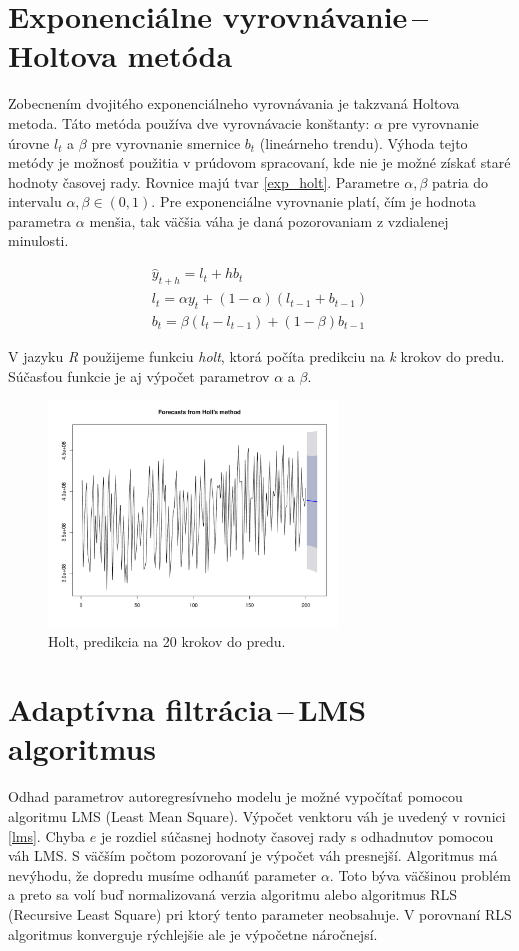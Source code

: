 \documentclass[12pt,a4paper,oneside,final]{article}
\theoremstyle{definition}
\theoremstyle{remark}
\numberwithin{equation}{section}
\begin{document}
\section{Exponenciálne vyrovnávanie\,--\,Holtova metóda}
Zobecnením dvojitého exponenciálneho vyrovnávania je takzvaná Holtova metoda.
Táto metóda používa dve vyrovnávacie konštanty: $\alpha$ pre vyrovnanie úrovne $l_t$
a $\beta$ pre vyrovnanie smernice $b_t$ (lineárneho trendu).
Výhoda tejto metódy je možnosť použitia v prúdovom spracovaní, kde nie je možné získať staré hodnoty časovej rady. 
Rovnice majú tvar \ref{exp_holt}. Parametre $\alpha, \beta$ patria do intervalu 
$\alpha,\beta \in (0,1)$. Pre exponenciálne vyrovnanie platí, 
čím je hodnota parametra $\alpha$ menšia, tak väčšia váha je daná pozorovaniam z
vzdialenej minulosti.

\begin{eqnarray} \label{exp_holt}
    \hat{y}_{t+h} = l_{t} + hb_{t} \\
    \nonumber l_t = \alpha y_t + (1 - \alpha) (l_{t-1} + b_{t-1}) \\
    \nonumber b_t = \beta (l_t - l_{t-1}) + (1 - \beta)b_{t-1} 
\end{eqnarray}
 
V jazyku \emph{R} použijeme funkciu \emph{holt}, ktorá počíta predikciu na \emph{k} krokov 
do predu. Súčasťou funkcie je aj výpočet parametrov $\alpha$ a $\beta$.

\begin{figure}[H]
    \begin{center}
        \includegraphics[width=.8\textwidth,height=6cm]{images/heap_holt.pdf}
        \caption{Holt, predikcia na 20 krokov do predu.}
        \label{obr:heap_holt}
    \end{center}
\end{figure}

\section{Adaptívna filtrácia\,--\,LMS algoritmus}
Odhad parametrov autoregresívneho modelu je možné vypočítať 
pomocou algoritmu LMS (Least Mean Square). Výpočet venktoru váh je uvedený v
rovnici \ref{lms}. Chyba $e$ je rozdiel súčasnej hodnoty časovej rady s odhadnutov pomocou
váh LMS. S väčším počtom pozorovaní je výpočet váh presnejší. Algoritmus 
má nevýhodu, že dopredu musíme odhanúť parameter $\alpha$. Toto býva väčšinou problém 
a preto sa volí buď normalizovaná verzia algoritmu alebo algoritmus RLS (Recursive Least
Square) pri ktorý tento parameter neobsahuje. V porovnaní RLS algoritmus konverguje
rýchlejšie ale je výpočetne náročnejsí.  
\end{document}
